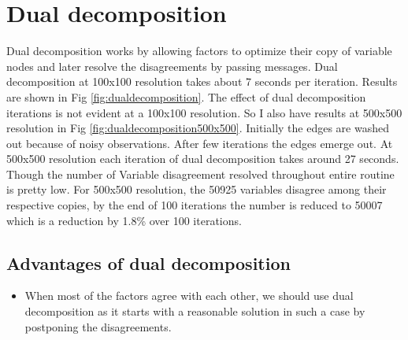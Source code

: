 \documentclass[10pt,oneside,letterpaper]{article}
\begin{document}
\section{Dual decomposition}
Dual decomposition \cite{sontag2011introduction} works by allowing factors to optimize their copy of variable nodes and later resolve the disagreements by passing messages.  Dual decomposition at 100x100 resolution takes about 7 seconds per iteration. Results are shown in Fig \ref{fig:dualdecomposition}. The effect of dual decomposition iterations is not evident at a 100x100 resolution. So I also have results at 500x500 resolution in Fig \ref{fig:dualdecomposition500x500}. Initially the edges are washed out because of noisy observations. After few iterations the edges emerge out. At 500x500 resolution each iteration of dual decomposition takes around 27 seconds. Though the number of Variable disagreement resolved throughout entire routine is pretty low. For 500x500 resolution, the 50925 variables disagree among their respective copies, by the end of 100 iterations the number is reduced to 50007 which is a reduction by 1.8\% over 100 iterations. 
\subsection{Advantages of dual decomposition}
\begin{itemize}
  \item When most of the factors agree with each other, we should use dual decomposition as it starts with a reasonable solution in such a case by postponing the disagreements.
\end{itemize}
\end{document}
